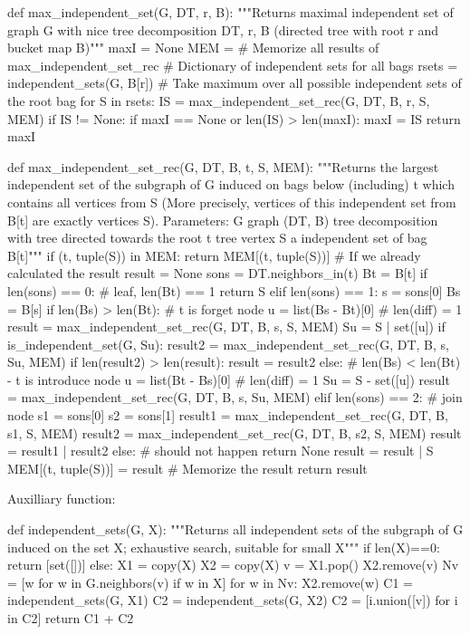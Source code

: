 \begin{sageCell}
def max_independent_set(G, DT, r, B):
    """Returns maximal independent set of graph G with nice tree decomposition DT, r, B (directed tree with root r and
    bucket map B)"""
    maxI = None
    MEM = {}  # Memorize all results of max_independent_set_rec
    # Dictionary of independent sets for all bags
    rsets = independent_sets(G, B[r])
    # Take maximum over all possible independent sets of the root bag
    for S in rsets:
        IS = max_independent_set_rec(G, DT, B, r, S, MEM)
        if IS != None:
            if maxI == None or len(IS) > len(maxI):
                maxI = IS
    return maxI

def max_independent_set_rec(G, DT, B, t, S, MEM):
    """Returns the largest independent set of the subgraph of G induced on bags below (including) t
    which contains all vertices from S (More precisely, vertices of this independent set from B[t] are exactly vertices S).
    Parameters:
      G        graph
      (DT, B)  tree decomposition with tree directed towards the root
      t        tree vertex
      S        a independent set of bag B[t]"""
    if (t, tuple(S)) in MEM:
        return MEM[(t, tuple(S))]  # If we already calculated the result
    result = None
    sons = DT.neighbors_in(t)
    Bt = B[t]
    if len(sons) == 0: # leaf, len(Bt) == 1
        return S
    elif len(sons) == 1:
        s = sons[0]
        Bs = B[s]
        if len(Bs) > len(Bt): # t is forget node
            u = list(Bs - Bt)[0]  # len(diff) = 1
            result = max_independent_set_rec(G, DT, B, s, S, MEM)
            Su = S | set([u])
            if is_independent_set(G, Su):
                result2 = max_independent_set_rec(G, DT, B, s, Su, MEM)
                if len(result2) > len(result):
                    result = result2
        else: # len(Bs) < len(Bt) - t is introduce node
            u = list(Bt - Bs)[0]  # len(diff) = 1
            Su = S - set([u])
            result = max_independent_set_rec(G, DT, B, s, Su, MEM)
    elif len(sons) == 2:  # join node
        s1 = sons[0]
        s2 = sons[1]
        result1 = max_independent_set_rec(G, DT, B, s1, S, MEM)
        result2 = max_independent_set_rec(G, DT, B, s2, S, MEM)
        result = result1 | result2
    else:
        # should not happen
        return None
    result = result | S
    MEM[(t, tuple(S))] = result  # Memorize the result
    return result
\end{sageCell}
Auxilliary function:
\begin{sageCell}
def independent_sets(G, X):
    """Returns all independent sets of the subgraph of G induced on the set X; exhaustive search, suitable for small X"""
    if len(X)==0:
        return [set([])]
    else:
        X1 = copy(X)
        X2 = copy(X)
        v = X1.pop()
        X2.remove(v)
        Nv = [w for w in G.neighbors(v) if w in X]
        for w in Nv:
            X2.remove(w)
        C1 = independent_sets(G, X1)
        C2 = independent_sets(G, X2)
        C2 = [i.union([v]) for i in C2]
        return C1 + C2
\end{sageCell}

